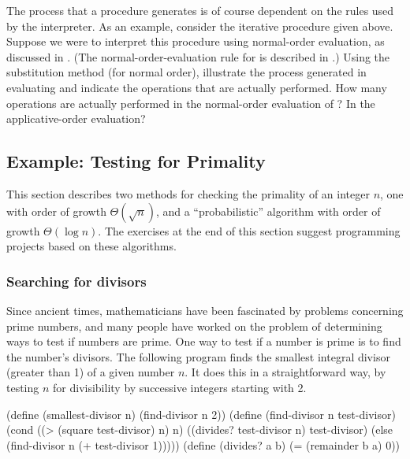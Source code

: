 \begin{exerciseGroup}
\label{Exercise 1.20}
 The process that a procedure
generates is of course dependent on the rules used by the interpreter.  As an
example, consider the iterative  procedure given above.  Suppose we
were to interpret this procedure using normal-order evaluation, as discussed in
.  (The normal-order-evaluation rule for  is
described in .)  Using the substitution method (for normal
order), illustrate the process generated in evaluating  and
indicate the  operations that are actually performed.  How many
 operations are actually performed in the normal-order
evaluation of ?  In the applicative-order evaluation?
\end{exerciseGroup}

\subsection{Example: Testing for Primality}
\label{Section 1.2.6}

This section describes two methods for checking the primality of an integer
\( n \), one with order of growth \( \Theta(\sqrt{n}) \), and a
``probabilistic'' algorithm with order of growth \( \Theta(\log n) \).
The exercises at the end of this section suggest programming projects based on
these algorithms.

\subsubsection*{Searching for divisors}

Since ancient times, mathematicians have been fascinated by problems concerning
prime numbers, and many people have worked on the problem of determining ways
to test if numbers are prime.  One way to test if a number is prime is to find
the number's divisors.  The following program finds the smallest integral
divisor (greater than 1) of a given number \( n \).  It does this in a
straightforward way, by testing \( n \) for divisibility by successive integers
starting with 2.

\begin{codeBlock}
(define (smallest-divisor n) (find-divisor n 2))
(define (find-divisor n test-divisor)
  (cond ((> (square test-divisor) n) n)
        ((divides? test-divisor n) test-divisor)
        (else (find-divisor n (+ test-divisor 1)))))
(define (divides? a b) (= (remainder b a) 0))
\end{codeBlock}

